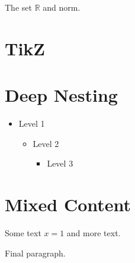 \documentclass{article}
\begin{document}
\newcommand{\R}{\mathbb{R}}

The set $\R$ and norm.

\section{TikZ}


\section{Deep Nesting}

\begin{itemize}
  \item Level 1
  \begin{itemize}
    \item Level 2
    \begin{itemize}
      \item Level 3
    \end{itemize}
  \end{itemize}
\end{itemize}

\section{Mixed Content}

Some text $x = 1$ and %
more text.


Final paragraph.
\end{document}
